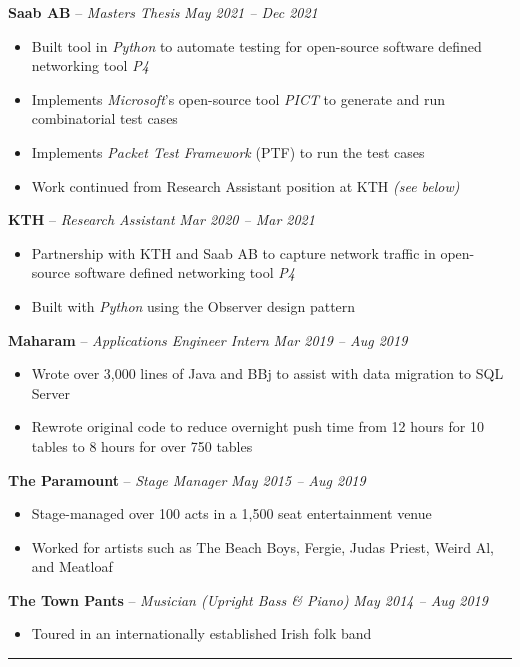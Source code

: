 \documentclass[10pt,letterpaper]{article}
\begin{document}
\headedsection
{\textbf{Saab AB} -- \textit{Masters Thesis}}
{\textit{May 2021 -- Dec 2021}} {
	\begin{itemize}[noitemsep,nolistsep]
		\item Built tool in \textit{Python} to automate testing for open-source software defined networking tool \textit{P4}
		\item Implements \textit{Microsoft}'s open-source tool \textit{PICT} to generate and run combinatorial test cases
		\item Implements \textit{Packet Test Framework} (PTF) to run the test cases
		\item Work continued from Research Assistant position at KTH \textit{(see below)}
	\end{itemize}
}

\headedsection
{\textbf{KTH} -- \textit{Research Assistant}}
{\textit{Mar 2020 -- Mar 2021}} {
	\begin{itemize}[noitemsep,nolistsep]
		\item Partnership with KTH and Saab AB to capture network traffic in open-source software defined networking tool \textit{P4}
		\item Built with \textit{Python} using the Observer design pattern
	\end{itemize}
}

\headedsection
{\textbf{Maharam} -- \textit{Applications Engineer Intern}}
{\textit{Mar 2019 -- Aug 2019}} {
	\begin{itemize}[noitemsep,nolistsep]
		\item Wrote over 3,000 lines of Java and BBj to assist with data migration to SQL Server
		\item Rewrote original code to reduce overnight push time from 12 hours for 10 tables to 8 hours for over 750 tables
	\end{itemize}
}

\headedsection
{\textbf{The Paramount} -- \textit{Stage Manager}}
{\textit{May 2015 -- Aug 2019}} {
	\begin{itemize}[noitemsep,nolistsep]
		\item Stage-managed over 100 acts in a 1,500 seat entertainment venue
		\item Worked for artists such as The Beach Boys, Fergie, Judas Priest, Weird Al, and Meatloaf
	\end{itemize}
}

\headedsection
{\textbf{The Town Pants} -- \textit{Musician (Upright Bass \& Piano)}}
{\textit{May 2014 -- Aug 2019}} {
	\begin{itemize}[noitemsep,nolistsep]
		\item Toured in an internationally established Irish folk band
	\end{itemize}
}
\begin{center}\hrule\end{center}
\end{document}
